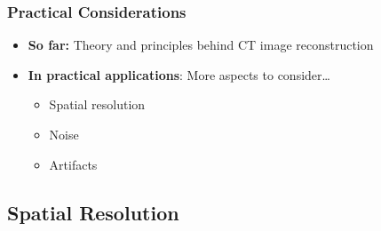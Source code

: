 
\begin{frame}
	\frametitle{Practical Considerations}

	\begin{itemize}
		\setlength\itemsep{0.5cm}
		\item \textcolor{faublue}{\textbf{So far:}} Theory and principles behind CT image reconstruction
		\item \textcolor{faublue}{\textbf{In practical applications}}: More aspects to consider\ldots
		      \begin{itemize}
			      \item Spatial resolution
			      \item Noise
			      \item Artifacts
		      \end{itemize}
	\end{itemize}

\end{frame}


\subsection{Spatial Resolution}

